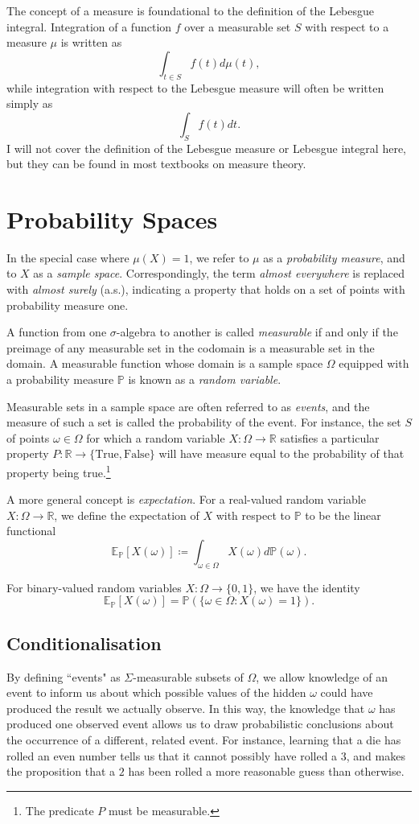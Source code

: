 \documentclass[honours,12pt]{unswthesis}
\numberwithin{equation}{section}
\begin{document}
The concept of a measure is foundational to the definition of the Lebesgue integral. Integration of a function $f$ over a measurable set $S$ with respect to a measure $\mu$ is written as
$$\int_{t\in S} f(t) d\mu(t),$$
while integration with respect to the Lebesgue measure will often be written simply as
$$\int_S f(t)dt.$$
I will not cover the definition of the Lebesgue measure or Lebesgue integral here, but they can be found in most textbooks on measure theory.

\section{Probability Spaces}
In the special case where $\mu(X)=1$, we refer to $\mu$ as a \textit{probability measure}, and to $X$ as a \textit{sample space}. Correspondingly, the term \textit{almost everywhere} is replaced with \textit{almost surely} (a.s.), indicating a property that holds on a set of points with probability measure one.

A function from one $\sigma$-algebra to another is called \textit{measurable} if and only if the preimage of any measurable set in the codomain is a measurable set in the domain. A measurable function whose domain is a sample space $\Omega$ equipped with a probability measure $\mathbb{P}$ is known as a \textit{random variable}.

Measurable sets in a sample space are often referred to as \textit{events}, and the measure of such a set is called the probability of the event. For instance, the set $S$ of points $\omega\in\Omega$ for which a random variable $X:\Omega\to\mathbb{R}$ satisfies a particular property $P:\mathbb{R}\to\{\mathrm{True},\mathrm{False}\}$ will have measure equal to the probability of that property being true.\footnote{The predicate $P$ must be measurable.}

A more general concept is \textit{expectation}. For a real-valued random variable $X:\Omega\to \mathbb{R}$, we define the expectation of $X$ with respect to $\mathbb{P}$ to be the linear functional
$$\mathbb{E}_{\mathbb{P}}[X(\omega)] \coloneq \int_{\omega\in\Omega} X(\omega)d\mathbb{P}(\omega).$$

For binary-valued random variables $X:\Omega\to\{0,1\}$, we have the identity
$$\mathbb{E}_\mathbb{P}[X(\omega)] = \mathbb{P}\left(\{\omega\in\Omega : X(\omega)=1\}\right).$$

\subsection{Conditionalisation}
By defining ``events" as $\Sigma$-measurable subsets of $\Omega$, we allow knowledge of an event to inform us about which possible values of the hidden $\omega$ could have produced the result we actually observe. In this way, the knowledge that $\omega$ has produced one observed event allows us to draw probabilistic conclusions about the occurrence of a different, related event. For instance, learning that a die has rolled an even number tells us that it cannot possibly have rolled a $3$, and makes the proposition that a $2$ has been rolled a more reasonable guess than otherwise.
\end{document}
